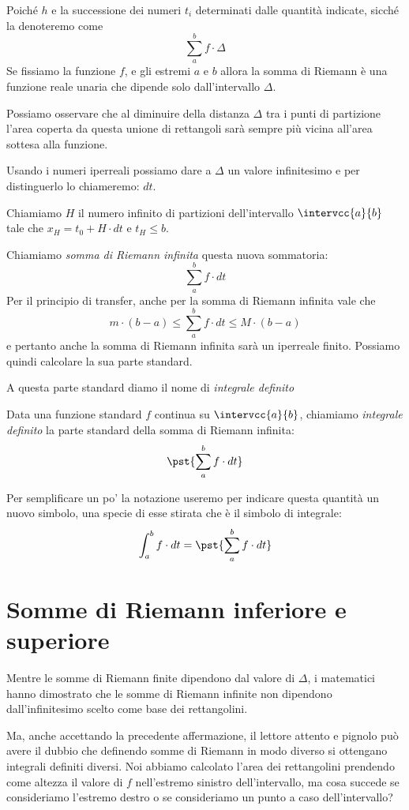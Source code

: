 Poiché \(h\) e la successione dei numeri \(t_i\) determinati 
dalle quantità indicate, sicché la denoteremo come 
\[\sum_a^b f \cdot \Delta\] 
Se fissiamo la funzione \(f\), e gli estremi \(a\) e \(b\) allora la somma di 
Riemann è una funzione reale unaria che dipende solo dall'intervallo  
\(\Delta\). 


Possiamo osservare che al diminuire della distanza \(\Delta\) tra i punti di 
partizione l'area coperta da questa unione di rettangoli sarà sempre più 
vicina all'area sottesa alla funzione.

Usando i numeri iperreali possiamo dare a \(\Delta\) un valore infinitesimo e 
per distinguerlo lo chiameremo: \(dt\).

Chiamiamo \(H\) il numero infinito di partizioni dell'intervallo 
\(\intervcc{a}{b}\) tale che \(x_H = t_0 + H \cdot dt\) e \(t_H \le b\).

Chiamiamo \emph{somma di Riemann infinita} questa nuova sommatoria:
\[\sum_a^b f \cdot dt\]
Per il principio di transfer, anche per la somma di Riemann infinita vale 
che 
\[m \cdot (b - a) \le  \sum_a^b f \cdot dt  \le M\cdot(b - a)\]
e pertanto anche la somma di Riemann infinita sarà un iperreale finito. 
Possiamo quindi calcolare la sua parte standard. 

A questa parte standard diamo il nome di \emph{integrale definito}
\begin{definizione}
Data una funzione standard \(f\) continua su \(\intervcc{a}{b}\),
chiamiamo \emph{integrale definito} la parte standard della 
somma di Riemann infinita:
\[\pst{\sum_a^b f \cdot dt}\]
\end{definizione}

Per semplificare un po' la notazione useremo per indicare questa quantità un 
nuovo simbolo, una specie di esse stirata che è il simbolo di integrale:
\[\int_a^b f \cdot dt = \pst{\sum_a^b f \cdot dt}\]

\section{Somme di Riemann inferiore e superiore}
\label{sec:integrali_somme_riemann}

Mentre le somme di Riemann finite dipendono dal valore di \(\Delta\), i 
matematici hanno dimostrato che le somme di Riemann infinite non dipendono 
dall'infinitesimo scelto come base dei rettangolini.

Ma, anche accettando la precedente affermazione, il lettore attento e pignolo 
può avere il dubbio che definendo somme di 
Riemann in modo diverso si ottengano integrali definiti diversi. 
Noi abbiamo 
calcolato l'area dei rettangolini prendendo come altezza il valore di \(f\) 
nell'estremo sinistro dell'intervallo, ma cosa succede se consideriamo 
l'estremo destro o se consideriamo un punto a caso dell'intervallo?

